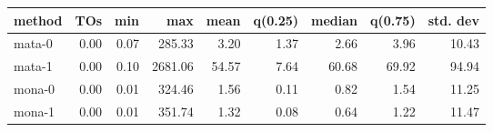 \begin{tabular}{lrrrrrrrr}
\hline
 method   &   TOs &   min &     max &   mean &   q(0.25) &   median &   q(0.75) &   std. dev \\
\hline
 mata-0   &  0.00 &  0.07 &  285.33 &   3.20 &      1.37 &     2.66 &      3.96 &      10.43 \\
 mata-1   &  0.00 &  0.10 & 2681.06 &  54.57 &      7.64 &    60.68 &     69.92 &      94.94 \\
 mona-0   &  0.00 &  0.01 &  324.46 &   1.56 &      0.11 &     0.82 &      1.54 &      11.25 \\
 mona-1   &  0.00 &  0.01 &  351.74 &   1.32 &      0.08 &     0.64 &      1.22 &      11.47 \\
\hline
\end{tabular}
